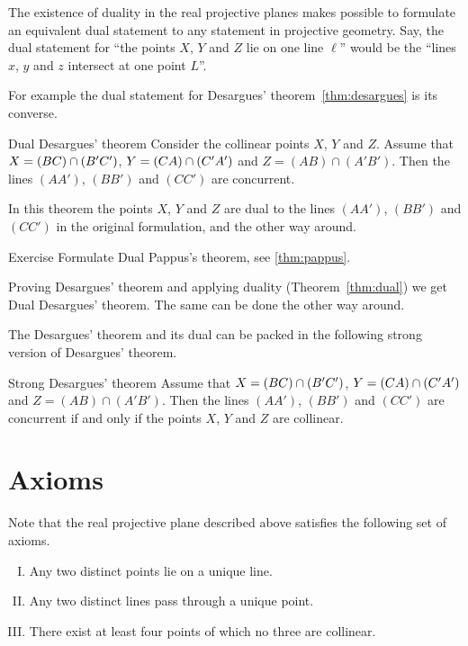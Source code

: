The existence of duality in the real projective planes makes possible to formulate an equivalent dual statement to any statement in projective geometry.
Say, the dual statement for ``the points $X$, $Y$ and $Z$ lie on one line $\ell$''
would be the ``lines $x$, $y$ and $z$ intersect at one point $L$''.

For example the dual statement for Desargues' theorem~\ref{thm:desargues} is its converse.
 

\begin{thm}{Dual Desargues' theorem}
Consider the collinear points $X$, $Y$ and $Z$.
Assume that $X\z=(BC)\cap (B'C')$, $Y\z=(CA)\cap (C'A')$ and $Z=(AB)\cap (A'B')$.
Then the lines  $(AA')$, $(BB')$ and $(CC')$ are concurrent.
\end{thm}

In this theorem the points $X$, $Y$ and $Z$ 
are dual to the lines $(AA')$, $(BB')$ and $(CC')$ in the original formulation, and the other way around.

\begin{thm}{Exercise}\label{ex:dual-pappus}
Formulate Dual Pappus's theorem, see \ref{thm:pappus}.
\end{thm}

Proving Desargues' theorem 
and applying duality (Theorem~\ref{thm:dual})
we get Dual Desargues' theorem.
The same can be done the other way around.

The Desargues' theorem and its dual can be packed in the
following strong version of Desargues' theorem.

\begin{thm}{Strong Desargues' theorem}
Assume that $X\z=(BC)\z\cap (B'C')$, $Y\z=(CA)\cap (C'A')$ and $Z=(AB)\cap (A'B')$.
Then the lines  $(AA')$, $(BB')$ and $(CC')$ are concurrent if and only if the  points $X$, $Y$ and $Z$ are collinear.
\end{thm}

\section*{Axioms}

Note that the real projective plane described above satisfies the following set of axioms.

\begin{enumerate}[I.]
\item\label{def:proj-axioms:1} Any two distinct points lie on a unique line.
\item\label{def:proj-axioms:2} Any two distinct lines pass through a unique point.
\item\label{def:proj-axioms:3} There exist at least four points of which no three are collinear.
\end{enumerate}

